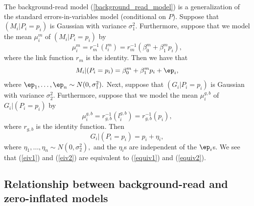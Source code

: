 \documentclass[12pt]{article}
\begin{document}
The background-read model (\ref{background_read_model}) is a generalization of the standard errors-in-variables model (conditional on $P$). Suppose that $(M_i | P_i = p_i)$ is Gaussian with variance $\sigma_1^2$. Furthermore, suppose that we model the mean $\mu^m_i$ of $(M_i | P_i = p_i)$ by $$ \mu_i^m = r_m^{-1}( l_i^m ) = r_m^{-1}( \beta^m_0 + \beta^m_1 p_i),$$ where the link function $r_m$ is the identity. Then we have that
\begin{equation}\label{equiv1} M_i | (P_i  = p_i) = \beta^m_0 + \beta^m_1 p_i + \ep_i, \end{equation} where $\ep_1 ,\dots, \ep_n \sim N(0,\sigma_1^2).$ Next, suppose that $(G_i | P_i = p_i)$ is Gaussian with variance $\sigma_2^2$. Furthermore, suppose that we model the mean $\mu^{g,b}_i$ of $G_i | (P_i = p_i)$ by $$ \mu^{g,b}_i = r_{g,b}^{-1}(l_i^{g,b}) = r_{g,b}^{-1}( p_i),$$ where $r_{g,b}$ is the identity function. Then \begin{equation}\label{equiv2} G_i | (P_i = p_i) = p_i + \eta_i,\end{equation} where $\eta_1, \dots, \eta_n \sim N(0,\sigma_2^2),$ and the $\eta_i$s are independent of the $\ep_i$s. We see that (\ref{eiv1}) and (\ref{eiv2}) are equivalent to (\ref{equiv1}) and (\ref{equiv2}).

\subsection{Relationship between background-read and zero-inflated models}
\end{document}
